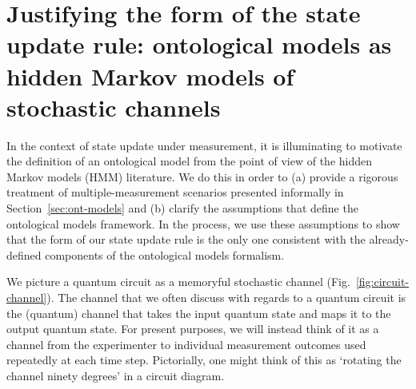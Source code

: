 \documentclass[%
 reprint,
superscriptaddress,
nofootinbib,
 amsmath,amssymb,
 prx, 
 accepted=2019-09-27,
]{quantumarticle}
\begin{document}
\section{Justifying the form of the state update rule: ontological
  models as hidden Markov models of stochastic channels}
\label{sec:hmm-appendix}



In the context of state update under measurement, it is illuminating
to motivate the definition of an ontological model from the point of
view of the hidden Markov models (HMM) literature. We do this in order
to (a) provide a rigorous treatment of multiple-measurement scenarios
presented informally in Section~\ref{sec:ont-models} and (b) clarify
the assumptions that define the ontological models framework. In the
process, we use these assumptions to show that the form of our state
update rule is the only one consistent with the already-defined
components of the ontological models formalism.

We picture a quantum circuit as a memoryful stochastic channel
(Fig.~\ref{fig:circuit-channel}). The channel that we often discuss
with regards to a quantum circuit is the (quantum) channel that takes
the input quantum state and maps it to the output quantum state. For
present purposes, we will instead think of it as a channel from the
experimenter to individual measurement outcomes used repeatedly at
each time step. Pictorially, one might think of this as `rotating the
channel ninety degrees' in a circuit diagram.
\end{document}

